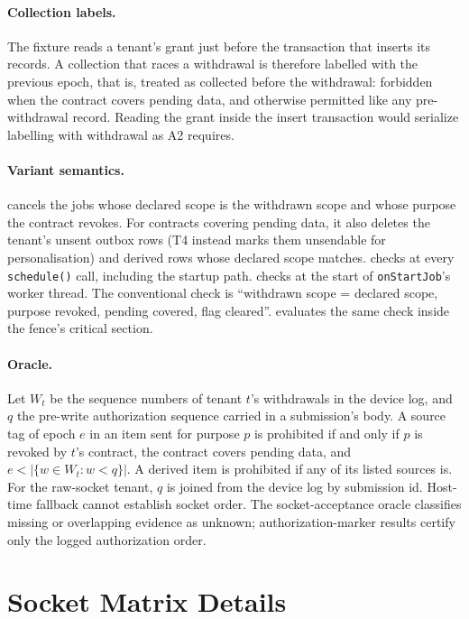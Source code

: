 \paragraph{Collection labels.} The fixture reads a tenant's grant just before the transaction that inserts its records.
A collection that races a withdrawal is therefore labelled with the previous epoch, that is, treated as collected before
the withdrawal: forbidden when the contract covers pending data, and otherwise permitted like any pre-withdrawal record.
Reading the grant inside the insert transaction would serialize labelling with withdrawal as A2 requires.

\paragraph{Variant semantics.}  cancels the jobs whose declared scope is the withdrawn scope and whose
purpose the contract revokes. For contracts covering pending data, it also deletes the tenant's unsent outbox rows (T4 instead marks them
unsendable for personalisation) and derived rows whose declared scope matches.  checks at every
\texttt{schedule()} call, including the startup path.  checks at the start of \texttt{onStartJob}'s worker
thread. The conventional check is ``withdrawn scope = declared scope, purpose revoked, pending covered, flag cleared''. 
evaluates the same check inside the fence's critical section.

\paragraph{Oracle.} Let $W_t$ be the sequence numbers of tenant $t$'s withdrawals in the device log, and $q$ the pre-write authorization
sequence carried in a submission's body. A source tag of epoch $e$ in an item sent for purpose $p$ is prohibited if and only if
$p$ is revoked by $t$'s contract, the contract covers pending data, and $e < |\{w\in W_t: w<q\}|$. A derived item is
prohibited if any of its listed sources is. For the raw-socket tenant, $q$ is joined from the device log by submission id.
Host-time fallback cannot establish socket order. The socket-acceptance oracle classifies missing or overlapping evidence as unknown; authorization-marker results certify only the logged authorization order.

\section{Socket Matrix Details}
\label{app:socket}



